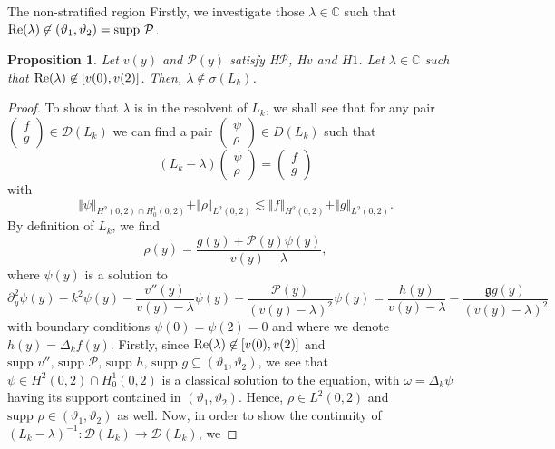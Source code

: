 \documentclass[11pt,reqno]{amsproc}
\makeatletter
\renewcommand\subsection{\@startsection{subsection}{2}%
\normalparindent{.5\linespacing\@plus.7\linespacing}{-.5em}
{\normalfont\bfseries}}
\newtheorem{proposition}{Proposition}[section]
\theoremstyle{definition}
\numberwithin{equation}{section}
\newcommand{\C}{{\mathbb C}}
\newcommand{\g}{{\mathfrak{g}}}
\renewcommand{\P}{{\mathcal{P}}}
\def\Re{{\rm Re}}
\makeatother
\begin{document}
\subsection{The non-stratified region}
Firstly, we investigate those $\lambda\in \C$ such that $\Re(\lambda) \not \in (\vartheta_1, \vartheta_2)=\text{supp }\P$.

\begin{proposition}\label{prop:rangerealcomplementresolvent}
Let $v(y)$ and $\P(y)$ satisfy {H$\P$, H$v$} and $H1$. Let $\lambda\in \C$ such that $\Re(\lambda)\not \in [v(0),v(2)]$. Then, $\lambda\not\in \sigma(L_k)$.
\end{proposition}

\begin{proof}
To show that $\lambda$ is in the resolvent of $L_k$, we shall see that for any pair $\begin{pmatrix}
f \\ g
\end{pmatrix}\in \mathcal{D}(L_k)$ we can find a pair $\begin{pmatrix}
\psi \\ \rho
\end{pmatrix}\in D(L_k)$ such that
\begin{equation}\label{eq:resolventeq}
\left(L_k-\lambda\right)\begin{pmatrix}
\psi \\ \rho
\end{pmatrix} = \begin{pmatrix}
f \\ g
\end{pmatrix}
\end{equation}
with
\begin{equation}\label{eq:resolventbound}
\Vert \psi \Vert_{H^2(0,2)\cap H^1_0(0,2)} + \Vert \rho \Vert_{L^2(0,2)} \lesssim \Vert f \Vert_{H^2(0,2)} + \Vert g \Vert_{L^2(0,2)}.
\end{equation}
By definition of $L_k$, we find
\begin{equation}\label{eq:resolventrho}
\rho(y) = \frac{g(y) + \P(y)\psi(y)}{v(y) - \lambda},
\end{equation}
where $\psi(y)$ is a solution to
\begin{equation}\label{eq:resolventTG}
\partial_y^2 \psi(y) - k^2\psi(y) - \frac{v''(y)}{v(y) - \lambda}\psi(y) + \frac{\P(y)}{(v(y) - \lambda)^2}\psi(y) = \frac{h(y)}{v(y) - \lambda} - \frac{\g g(y)}{(v(y) - \lambda)^2}
\end{equation}
with boundary conditions $\psi(0) = \psi(2)=0$ and where we denote $h(y) = \Delta_k f(y)$. Firstly, since $\Re(\lambda)\not \in [v(0),v(2)]$ and $\text{supp }v'', \, \text{supp }\P, \, \text{supp } h, \, \text{supp }g \subseteq (\vartheta_1, \vartheta_2)$, we see that $\psi\in H^2(0,2)\cap H^1_0(0,2)$ is a classical solution to the equation, with $\omega = \Delta_k \psi$ having its support contained in $(\vartheta_1, \vartheta_2)$. Hence, $\rho\in L^2(0,2)$ and $\text{supp } \rho \in (\vartheta_1, \vartheta_2)$ as well. Now, in order to show the continuity of $(L_k - \lambda)^{-1}:\mathcal{D}(L_k) \rightarrow\mathcal{D}(L_k) $, we

\end{proof}
\end{document}
